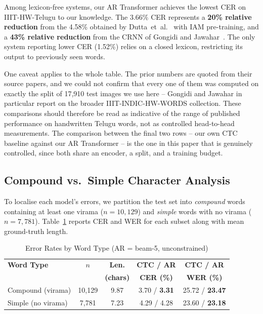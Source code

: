 \documentclass[conference]{IEEEtran}
\begin{document}
Among lexicon-free systems, our AR Transformer achieves the lowest CER on IIIT-HW-Telugu to our knowledge. The 3.66\% CER represents a \textbf{20\% relative reduction} from the 4.58\% obtained by Dutta~et~al.~\cite{dutta2018} with IAM pre-training, and a \textbf{43\% relative reduction} from the CRNN of Gongidi and Jawahar~\cite{gongidi2021iiit}. The only system reporting lower CER (1.52\%) relies on a closed lexicon, restricting its output to previously seen words.

One caveat applies to the whole table. The prior numbers are quoted from their source papers, and we could not confirm that every one of them was computed on exactly the split of 17,910 test images we use here -- Gongidi and Jawahar in particular report on the broader IIIT-INDIC-HW-WORDS collection. These comparisons should therefore be read as indicative of the range of published performance on handwritten Telugu words, not as controlled head-to-head measurements. The comparison between the final two rows -- our own CTC baseline against our AR Transformer -- is the one in this paper that is genuinely controlled, since both share an encoder, a split, and a training budget.

\subsection{Compound vs.\ Simple Character Analysis}

To localise each model's errors, we partition the test set into \textit{compound} words containing at least one virama ($n = 10{,}129$) and \textit{simple} words with no virama ($n = 7{,}781$). Table~\ref{tab:compound} reports CER and WER for each subset along with mean ground-truth length.

\begin{table}[htbp]
\centering
\small
\setlength{\tabcolsep}{4pt}
\caption{Error Rates by Word Type (AR = beam-5, unconstrained)}
\label{tab:compound}
\begin{tabular}{lcccc}
\toprule
\textbf{Word Type} & \textbf{$n$} & \textbf{Len.} & \textbf{CTC / AR} & \textbf{CTC / AR} \\
 & & \textbf{(chars)} & \textbf{CER (\%)} & \textbf{WER (\%)} \\
\midrule
Compound (virama) & 10,129 & 9.87 & 3.70 / \textbf{3.31} & 25.72 / \textbf{23.47} \\
Simple (no virama) & 7,781 & 7.23 & 4.29 / 4.28 & 23.60 / \textbf{23.18} \\
\bottomrule
\end{tabular}
\end{table}
\end{document}
